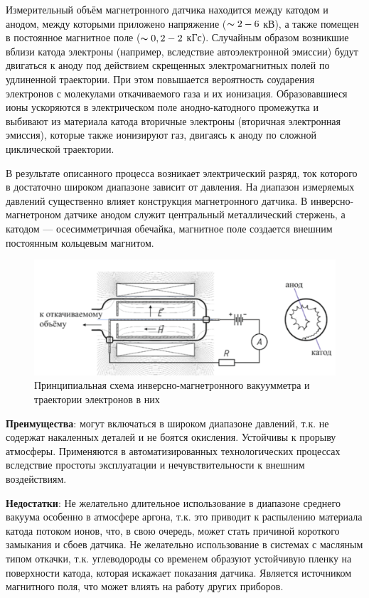 \documentclass[a4paper, 12pt]{article} %
\begin{document}
Измерительный объём магнетронного датчика находится
между катодом и анодом, между которыми приложено напряжение
($\thicksim 2-6$ кВ), а также помещен в постоянное магнитное поле ($\thicksim 0,2-2$ кГс).
Случайным образом возникшие вблизи катода электроны (например,
вследствие автоэлектронной эмиссии) будут двигаться к аноду под действием скрещенных электромагнитных полей по удлиненной траектории. При этом повышается вероятность соударения электронов с молекулами откачиваемого газа и их ионизация. Образовавшиеся ионы ускоряются в электрическом поле анодно-катодного промежутка и выбивают из материала катода вторичные электроны (вторичная электронная эмиссия), которые также ионизируют газ, двигаясь к аноду по сложной циклической траектории.

В результате описанного процесса возникает электрический разряд, ток которого в достаточно широком диапазоне зависит от давления.
На диапазон измеряемых давлений существенно влияет конструкция магнетронного датчика. В инверсно-магнетроном датчике анодом служит центральный металлический стержень, а катодом — осесимметричная
обечайка, магнитное поле создается внешним постоянным кольцевым
магнитом.

\begin{figure}[h]
    \centering
    \includegraphics[width = 13 cm]{Магнетрон}
    \caption{Принципиальная схема инверсно-магнетронного вакуумметра и траектории электронов в них}
    \label{fig:vac}
\end{figure}

\textbf{Преимущества}: могут включаться в широком диапазоне давлений, т.к. не содержат накаленных деталей и не боятся окисления. Устойчивы к прорыву атмосферы. Применяются в автоматизированных технологических процессах вследствие простоты эксплуатации
и нечувствительности к внешним воздействиям.

\textbf{Недостатки}: Не желательно длительное использование в диапазоне среднего вакуума особенно в атмосфере аргона, т.к. это приводит к распылению материала катода потоком ионов, что, в свою очередь, может стать причиной короткого замыкания и сбоев датчика. Не желательно использование в системах с масляным типом откачки, т.к. углеводороды со временем образуют устойчивую пленку на поверхности катода, которая искажает показания датчика. Является источником магнитного поля, что может влиять на работу других приборов.
\end{document}

